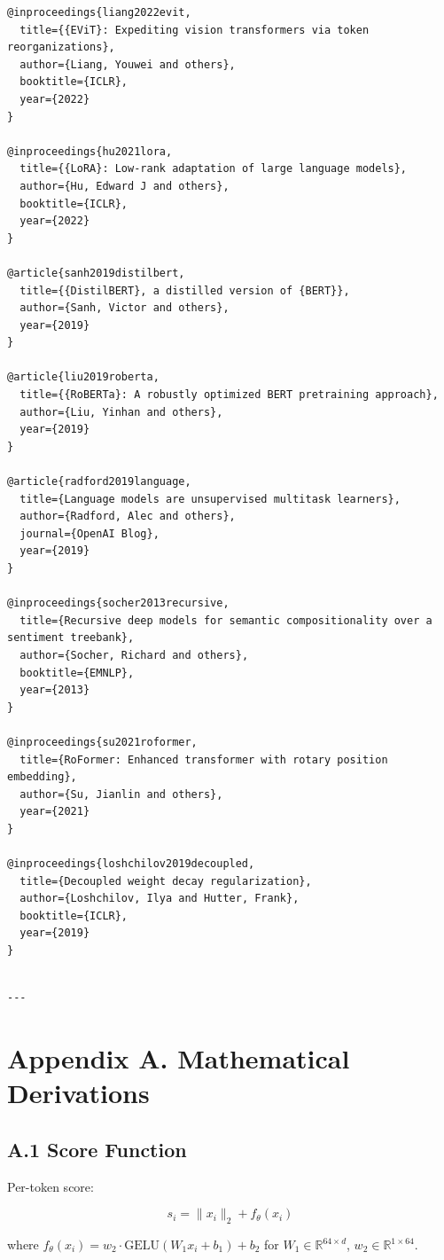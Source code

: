 \begin{lstlisting}
@inproceedings{liang2022evit,
  title={{EViT}: Expediting vision transformers via token reorganizations},
  author={Liang, Youwei and others},
  booktitle={ICLR},
  year={2022}
}

@inproceedings{hu2021lora,
  title={{LoRA}: Low-rank adaptation of large language models},
  author={Hu, Edward J and others},
  booktitle={ICLR},
  year={2022}
}

@article{sanh2019distilbert,
  title={{DistilBERT}, a distilled version of {BERT}},
  author={Sanh, Victor and others},
  year={2019}
}

@article{liu2019roberta,
  title={{RoBERTa}: A robustly optimized BERT pretraining approach},
  author={Liu, Yinhan and others},
  year={2019}
}

@article{radford2019language,
  title={Language models are unsupervised multitask learners},
  author={Radford, Alec and others},
  journal={OpenAI Blog},
  year={2019}
}

@inproceedings{socher2013recursive,
  title={Recursive deep models for semantic compositionality over a sentiment treebank},
  author={Socher, Richard and others},
  booktitle={EMNLP},
  year={2013}
}

@inproceedings{su2021roformer,
  title={RoFormer: Enhanced transformer with rotary position embedding},
  author={Su, Jianlin and others},
  year={2021}
}

@inproceedings{loshchilov2019decoupled,
  title={Decoupled weight decay regularization},
  author={Loshchilov, Ilya and Hutter, Frank},
  booktitle={ICLR},
  year={2019}
}
\end{lstlisting}
\begin{lstlisting}

---
\end{lstlisting}

\section{Appendix A. Mathematical Derivations}

\subsection{A.1 Score Function}

Per-token score:

\[
s_i = \|x_i\|_2 + f_\theta(x_i)
\tag{A.1}
\]

where $f_\theta(x_i) = w_2 \cdot \text{GELU}(W_1 x_i + b_1) + b_2$ for 
$W_1 \in \mathbb{R}^{64 \times d}$, $w_2 \in \mathbb{R}^{1 \times 64}$.

